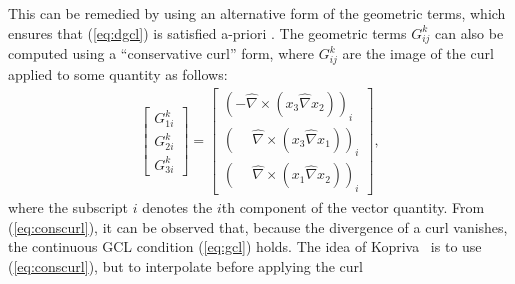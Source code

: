 \documentclass[10pt]{amsart}
\theoremstyle{definition}
\theoremstyle{lemma}
\theoremstyle{theorem}
\theoremstyle{assumption}
\renewcommand{\hat}{\widehat}
\newcommand{\pd}[2]{\frac{\partial#1}{\partial#2}}
\newcommand{\LRp}[1]{\left( #1 \right)}
\newcommand{\LRs}[1]{\left[ #1 \right]}
\newcommand{\Grad} {\ensuremath{\nabla}}
\begin{document}
{This can be remedied by using an alternative form of the geometric terms, which ensures that (\ref{eq:dgcl}) is satisfied a-priori \cite{thomas1979geometric, visbal2002use, kopriva2006metric}.  The geometric terms $G^k_{ij}$ can also be computed using a ``conservative curl'' form, where $G^k_{ij}$ are the image of the curl applied to some quantity
 as follows: %
\begin{align}
\LRs{\begin{array}{c}
G^k_{1i}\\
G^k_{2i}\\
G^k_{3i}\end{array}} =
\LRs{\begin{array}{c}
    {\left(         - \hat{\nabla} \times \left(x_3 \hat{\nabla} x_2\right)\right)}_i\\
    {\left(\phantom{-}\hat{\nabla} \times \left(x_3 \hat{\nabla} x_1\right)\right)}_i\\
    {\left(\phantom{-}\hat{\nabla} \times \left(x_1 \hat{\nabla} x_2\right)\right)}_i\end{array}},
\label{eq:conscurl}
\end{align}
where the subscript $i$ denotes the $i$th component of the vector quantity.
From (\ref{eq:conscurl}), it can be observed that, because the divergence of a curl vanishes, the continuous GCL condition (\ref{eq:gcl}) holds.  
The idea of Kopriva~\cite{kopriva2006metric} is to use (\ref{eq:conscurl}), but to interpolate before applying the curl  %
\begin{align}

\end{align}}
\end{document}
